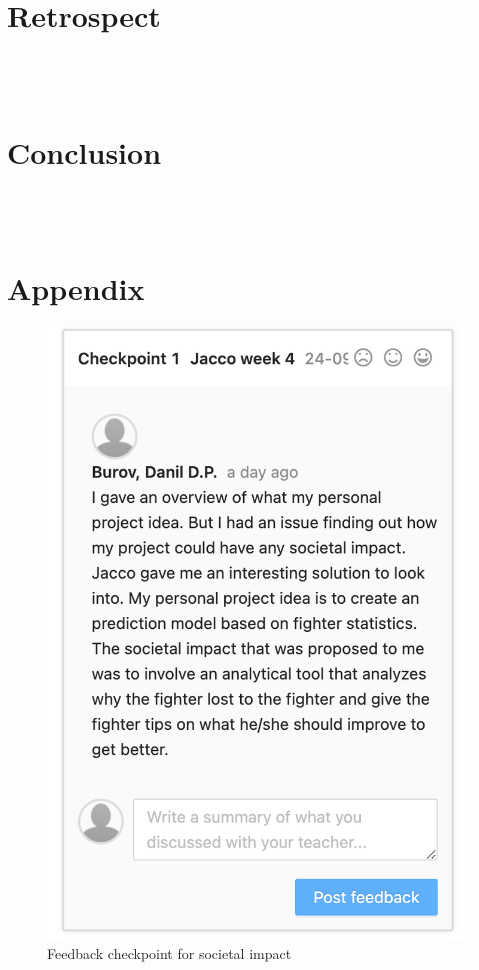 \documentclass{article}
\begin{document}
\section{Retrospect}\\\\ %
\section{Conclusion}\\\\ %
\section{Appendix}

\begin{figure}[h]
  \centering
  \includegraphics{images/Feedback_Societal_Impact.png}
  \caption{Feedback checkpoint for societal impact}
  \label{fig:appendix_image1}
\end{figure}
\end{document}
